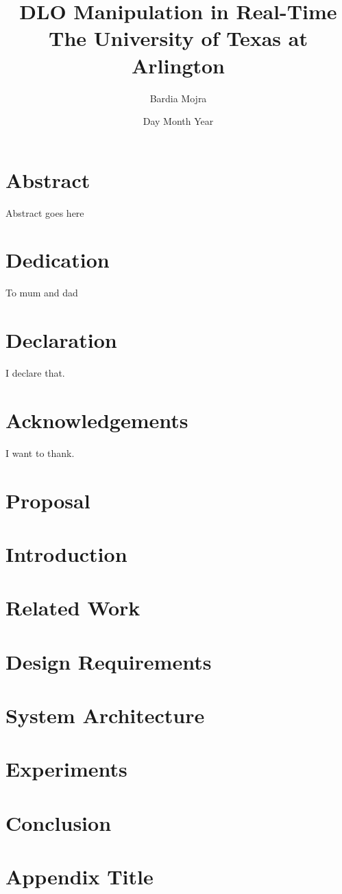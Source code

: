 \documentclass[12pt]{book}
\title{
{DLO Manipulation in Real-Time}\\
{\large The University of Texas at Arlington}\\
}
\author{Bardia Mojra}
\date{Day Month Year}
\begin{document}
\chapter*{Abstract}
Abstract goes here

\chapter*{Dedication}
To mum and dad

\chapter*{Declaration}
I declare that.

\chapter*{Acknowledgements}
I want to thank.

\tableofcontents

\chapter{Proposal}


\chapter{Introduction}


\chapter{Related Work}


\chapter{Design Requirements}


\chapter{System Architecture}


\chapter{Experiments}


\chapter{Conclusion}


\appendix
\chapter{Appendix Title}

\end{document}
